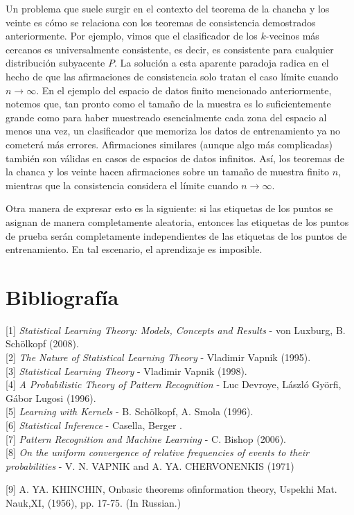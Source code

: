 \documentclass{report}
\begin{document}
Un problema que suele surgir en el contexto del teorema de la chancha y los veinte es cómo se relaciona con los 
teoremas de consistencia demostrados anteriormente. Por ejemplo, vimos que el clasificador 
de los \(k\)-vecinos más cercanos es universalmente consistente, es decir, es consistente para cualquier 
distribución subyacente \(P\). La solución a esta aparente paradoja radica en el hecho de que las afirmaciones de consistencia solo tratan 
el caso límite cuando \(n \to \infty\). En el ejemplo del espacio de datos finito mencionado anteriormente, 
notemos que, tan pronto como el tamaño de la muestra es lo suficientemente grande como para haber muestreado 
esencialmente cada zona del espacio al menos una vez, un clasificador que memoriza los datos de entrenamiento 
ya no cometerá más errores. Afirmaciones similares (aunque algo más complicadas) también son válidas en casos 
de espacios de datos infinitos. Así, los teoremas de la chanca y los veinte hacen afirmaciones sobre un tamaño de muestra finito \(n\), mientras que 
la consistencia considera el límite cuando \(n \to \infty\).\newline

Otra manera de expresar esto es la siguiente: si las etiquetas de los puntos se asignan de manera 
completamente aleatoria, entonces las etiquetas de los puntos de prueba serán completamente independientes 
de las etiquetas de los puntos de entrenamiento. En tal escenario, el aprendizaje es imposible.\newline

\bigbreak
\pagebreak
\chapter*{Bibliografía}

[1] \textit{Statistical Learning Theory: Models, Concepts and Results} - von Luxburg, B. Schölkopf (2008). \\

[2] \textit{The Nature of Statistical Learning Theory} - Vladimir Vapnik (1995). \\

[3] \textit{Statistical Learning Theory} - Vladimir Vapnik (1998). \\

[4] \textit{A Probabilistic Theory of Pattern Recognition} - Luc Devroye, László Györfi, Gábor Lugosi (1996). \\

[5] \textit{Learning with Kernels} - B. Schölkopf, A. Smola (1996). \\

[6] \textit{Statistical Inference} - Casella, Berger . \\

[7] \textit{Pattern Recognition and Machine Learning} - C. Bishop (2006). \\

[8] \textit{On the uniform convergence of relative frequencies of events to their probabilities} - V. N. VAPNIK and A. YA. CHERVONENKIS (1971)

[9] A. YA. KHINCHIN, Onbasic theorems ofinformation theory, Uspekhi Mat. Nauk,XI, (1956),
pp. 17-75. (In Russian.)
\end{document}

